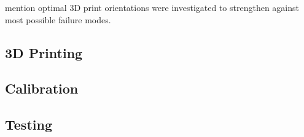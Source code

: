 mention optimal 3D print orientations were investigated to strengthen against most possible failure modes.

\subsection{3D Printing}

\subsection{Calibration}

\subsection{Testing}
